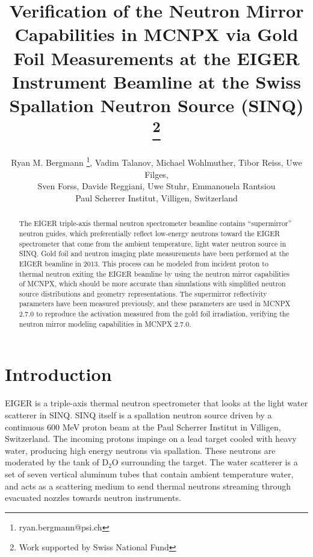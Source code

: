 \documentclass[a4paper,
              ]{jacow}
\begin{document}
\title{Verification of the Neutron Mirror Capabilities in MCNPX via Gold Foil Measurements at the EIGER Instrument Beamline at the Swiss Spallation Neutron Source (SINQ) \thanks{Work supported by Swiss National Fund}}

\author{Ryan M. Bergmann \thanks{ryan.bergmann@psi.ch}, Vadim Talanov, Michael Wohlmuther, Tibor Reiss, Uwe Filges, \\ Sven Forss, Davide Reggiani, Uwe Stuhr, Emmanouela Rantsiou\\ Paul Scherrer Institut, Villigen, Switzerland\\}

\maketitle

%
\begin{abstract}
   The EIGER triple-axis thermal neutron spectrometer beamline contains “supermirror” neutron guides, which preferentially reflect low-energy neutrons toward the EIGER spectrometer that come from the ambient temperature, light water neutron source in SINQ.  Gold foil and neutron imaging plate measurements have been performed at the EIGER beamline in 2013.  This process can be modeled from incident proton to thermal neutron exiting the EIGER beamline by using the neutron mirror capabilities of MCNPX, which should be more accurate than simulations with simplified neutron source distributions and geometry representations.  The supermirror reflectivity parameters have been measured previously, and these parameters are used in MCNPX 2.7.0 to reproduce the activation measured from the gold foil irradiation, verifying the neutron mirror modeling capabilities in MCNPX 2.7.0.
\end{abstract}


\section{Introduction}

EIGER is a triple-axis thermal neutron spectrometer that looks at the light water scatterer in SINQ.  SINQ itself is a spallation neutron source driven by a continuous 600 MeV proton beam at the Paul Scherrer Institut in Villigen, Switzerland.  The incoming protons impinge on a lead target cooled with heavy water, producing high energy neutrons via spallation.  These neutrons are moderated by the tank of D$_2$O surrounding the target.  The water scatterer is a set of seven vertical aluminum tubes that contain ambient temperature water, and acts as a scattering medium to send thermal neutrons streaming through evacuated nozzles towards neutron instruments.  
\end{document}
